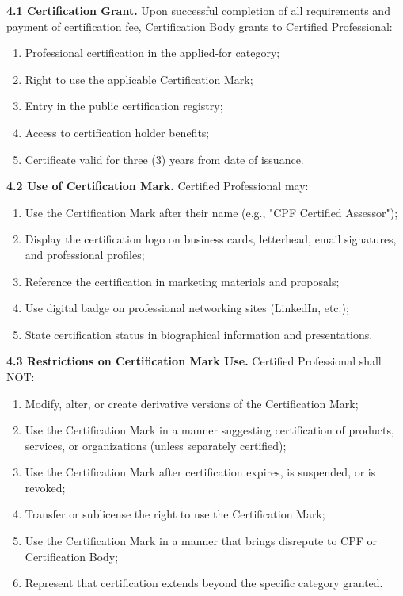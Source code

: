 \documentclass[11pt,a4paper]{article}
\begin{document}
\textbf{4.1 Certification Grant.} Upon successful completion of all requirements and payment of certification fee, Certification Body grants to Certified Professional:

\begin{enumerate}[label=\alph*)]
\item Professional certification in the applied-for category;
\item Right to use the applicable Certification Mark;
\item Entry in the public certification registry;
\item Access to certification holder benefits;
\item Certificate valid for three (3) years from date of issuance.
\end{enumerate}

\textbf{4.2 Use of Certification Mark.} Certified Professional may:

\begin{enumerate}[label=\alph*)]
\item Use the Certification Mark after their name (e.g., "CPF Certified Assessor");
\item Display the certification logo on business cards, letterhead, email signatures, and professional profiles;
\item Reference the certification in marketing materials and proposals;
\item Use digital badge on professional networking sites (LinkedIn, etc.);
\item State certification status in biographical information and presentations.
\end{enumerate}

\textbf{4.3 Restrictions on Certification Mark Use.} Certified Professional shall NOT:

\begin{enumerate}[label=\alph*)]
\item Modify, alter, or create derivative versions of the Certification Mark;
\item Use the Certification Mark in a manner suggesting certification of products, services, or organizations (unless separately certified);
\item Use the Certification Mark after certification expires, is suspended, or is revoked;
\item Transfer or sublicense the right to use the Certification Mark;
\item Use the Certification Mark in a manner that brings disrepute to CPF or Certification Body;
\item Represent that certification extends beyond the specific category granted.
\end{enumerate}
\end{document}
